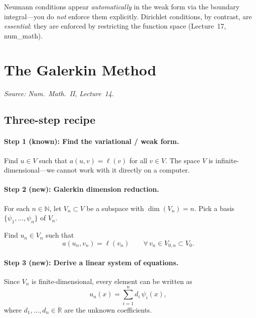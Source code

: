 \documentclass[11pt,a4paper]{article}
\theoremstyle{plain}
\theoremstyle{remark}
\newcommand{\R}{\mathbb{R}}
\newcommand{\N}{\mathbb{N}}
\newcommand{\Vn}{V_n}
\newcommand{\un}{u_n}
\newcommand{\vn}{v_n}
\let\origsubsection\subsection
\renewcommand{\subsection}{\needspace{6\baselineskip}\origsubsection}
\let\origparagraph\paragraph
\renewcommand{\paragraph}[1]{\needspace{4\baselineskip}\origparagraph{#1}}
\begin{document}
\begin{warning}
Neumann conditions appear \emph{automatically} in the weak form via the
boundary integral---you do \emph{not} enforce them explicitly.
Dirichlet conditions, by contrast, are \emph{essential}: they are
enforced by restricting the function space
(Lecture~17, num\_math).
\end{warning}

\newpage
\section{The Galerkin Method}
\label{sec:galerkin}

\textit{Source: Num.\ Math.\ II, Lecture~14.}

\subsection{Three-step recipe}

\paragraph{Step 1 (known): Find the variational / weak form.}
Find $u \in V$ such that $a(u,v) = \ell(v)$ for all $v \in V$.
The space $V$ is infinite-dimensional---we cannot work with it directly
on a computer.

\paragraph{Step 2 (new): Galerkin dimension reduction.}
For each $n \in \N$, let $\Vn \subset V$ be a subspace with
$\dim(\Vn) = n$.  Pick a basis $\{\psi_1, \ldots, \psi_n\}$ of $\Vn$.

\begin{definition}
Find $\un \in \Vn$ such that
\[
  a(\un, \vn) = \ell(\vn)
  \qquad \forall\, \vn \in V_{0,n} \subset V_0.
\]
\end{definition}

\paragraph{Step 3 (new): Derive a linear system of equations.}
Since $\Vn$ is finite-dimensional, every element can be written as
\[
  \un(x) = \sum_{i=1}^{n} d_i\,\psi_i(x),
\]
where $d_1, \ldots, d_n \in \R$ are the unknown coefficients.
\end{document}
